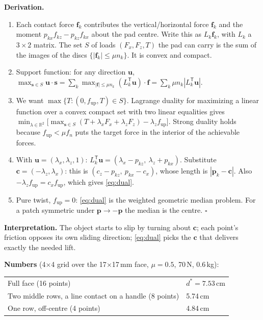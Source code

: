 \documentclass[11pt]{article}
\numberwithin{equation}{section}
\newcommand{\dstar}{d^{*}}
\newcommand{\R}{\mathbb{R}}
\begin{document}
\textbf{Derivation.}
\begin{enumerate}
  \item Each contact force $\bm f_k$ contributes the vertical/horizontal force $\bm f_k$ and the moment $p_{kx}f_{kz} - p_{kz}f_{kx}$ about the pad centre. Write this as $L_k\bm f_k$, with $L_k$ a $3\times2$ matrix. The set $S$ of loads $(F_x, F_z, T)$ the pad can carry is the sum of the images of the discs $\{|\bm f_k|\le\mu n_k\}$. It is convex and compact.
  \item Support function: for any direction $\bm u$, $\max_{\bm s\in S}\bm u\cdot\bm s = \sum_k\max_{|\bm f|\le\mu n_k}(L_k^{\mathsf T}\bm u)\cdot\bm f = \sum_k\mu n_k|L_k^{\mathsf T}\bm u|$.
  \item We want $\max\{T : (0, f_{\text{up}}, T)\in S\}$. Lagrange duality for maximizing a linear function over a convex compact set with two linear equalities gives $\min_{\lambda\in\R^2}\big[\max_{\bm s\in S}(T + \lambda_xF_x + \lambda_zF_z) - \lambda_zf_{\text{up}}\big]$. Strong duality holds because $f_{\text{up}} < \mu f_n$ puts the target force in the interior of the achievable forces.
  \item With $\bm u = (\lambda_x, \lambda_z, 1)$: $L_k^{\mathsf T}\bm u = (\lambda_x - p_{kz},\ \lambda_z + p_{kx})$. Substitute $\bm c = (-\lambda_z, \lambda_x)$: this is $(c_z - p_{kz},\ p_{kx} - c_x)$, whose length is $|\bm p_k - \bm c|$. Also $-\lambda_zf_{\text{up}} = c_xf_{\text{up}}$, which gives \eqref{eq:dual}.
  \item Pure twist, $f_{\text{up}} = 0$: \eqref{eq:dual} is the weighted geometric median problem. For a patch symmetric under $\bm p\to-\bm p$ the median is the centre. \hfill $\square$
\end{enumerate}
\textbf{Interpretation.} The object starts to slip by turning about $\bm c$; each point's friction opposes its own sliding direction; \eqref{eq:dual} picks the $\bm c$ that delivers exactly the needed lift.

\textbf{Numbers} (4$\times$4 grid over the 17$\times$17\,mm face, $\mu = 0.5$, 70\,N, 0.6\,kg):

\begin{tabular}{@{}ll@{}}
Full face (16 points) & $\dstar = 7.53$\,cm \\
Two middle rows, a line contact on a handle (8 points) & 5.74\,cm \\
One row, off-centre (4 points) & 4.84\,cm \\
\end{tabular}
\end{document}
